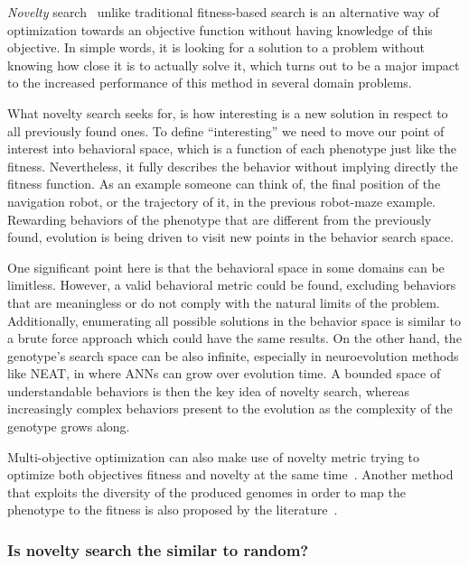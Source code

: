 \emph{Novelty} search~\citep{lehman2008exploiting,lehman2011abandoning,lehman2010revising, risi2009novelty} unlike traditional fitness-based search is an alternative way of optimization towards an objective function without having knowledge of this objective. In simple words, it is looking for a solution to a problem without knowing how close it is to actually solve it, which turns out to be a major impact to the increased performance of this method in several domain problems. 

What novelty search seeks for, is how interesting is a new solution in respect to all previously found ones. To define ``interesting'' we need to move our point of interest into behavioral space, which is a function of each phenotype just like the fitness. Nevertheless, it fully describes the behavior without implying directly the fitness function. As an example someone can think of, the final position of the navigation robot, or the trajectory of it, in the previous robot-maze example. Rewarding behaviors of the phenotype that are different from the previously found, evolution is being driven to visit new points in the behavior search space.

One significant point here is that the behavioral space in some domains can be limitless. However, a valid behavioral metric could be found, excluding behaviors that are meaningless or do not comply with the natural limits of the problem. Additionally, enumerating all possible solutions in the behavior space is similar to a brute force approach which could have the same results. On the other hand, the genotype's search space can be also infinite, especially in neuroevolution methods like NEAT, in where ANNs can grow over evolution time. A bounded space of understandable behaviors is then the key idea of novelty search, whereas increasingly complex behaviors present to the evolution as the complexity of the genotype grows along.

Multi-objective optimization can also make use of novelty metric trying to optimize both objectives fitness and novelty at the same time~\citep{mouret2011novelty}. Another method that exploits the diversity of the produced genomes in order to map the phenotype to the fitness is also proposed by the literature~\citep{mouret2012algorithm}.

\subsubsection*{Is novelty search the similar to random?}

